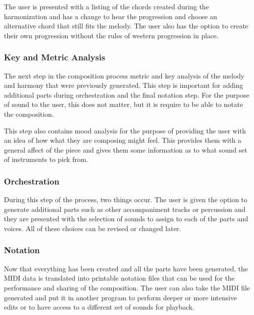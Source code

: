 The user is presented with a listing of the chords created during the harmonization and has a change to hear the progression and choose an alternative chord that still fits the melody.  The user also has the option to create their own progression without the rules of western progression in place.

\subsubsection{Key and Metric Analysis}
\label{subsubsec:analysis}

The next step in the composition process metric and key analysis of the melody and harmony that were previously generated.  This step is important for adding additional parts during orchestration and the final notation step.  For the purpose of sound to the user, this does not matter, but it is require to be able to notate the composition.

\vspace{\baselineskip}

This step also contains mood analysis for the purpose of providing the user with an idea of how what they are composing might feel.  This provides them with a general affect of the piece and gives them some information as to what sound set of instruments to pick from.

\subsubsection{Orchestration}
\label{subsubsec:orchestration}

During this step of the process, two things occur.  The user is given the option to generate additional parts such as other accompaniment tracks or percussion and they are presented with the selection of sounds to assign to each of the parts and voices.  All of these choices can be revised or changed later.

\subsubsection{Notation}
\label{subsubsec:notation}

Now that everything has been created and all the parts have been generated, the MIDI data is translated into printable notation files that can be used for the performance and sharing of the composition.  The user can also take the MIDI file generated and put it in another program to perform deeper or more intensive edits or to have access to a different set of sounds for playback.

